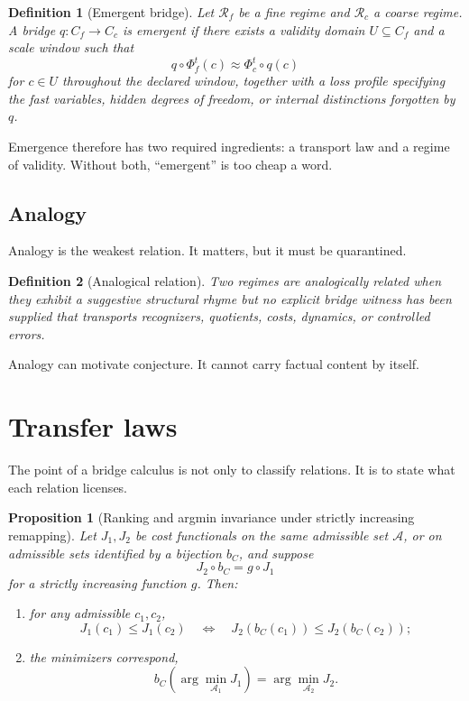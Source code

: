 \documentclass[11pt]{article}
\newtheorem{definition}{Definition}
\newtheorem{proposition}{Proposition}
\begin{document}
\begin{definition}[Emergent bridge]
Let $\mathcal{R}_f$ be a fine regime and $\mathcal{R}_c$ a coarse regime. A bridge $q:C_f\to C_c$ is emergent if there exists a validity domain $U\subseteq C_f$ and a scale window such that
\[
q\circ \Phi_f^t(c)\approx \Phi_c^t\circ q(c)
\]
for $c\in U$ throughout the declared window, together with a loss profile specifying the fast variables, hidden degrees of freedom, or internal distinctions forgotten by $q$.
\end{definition}

Emergence therefore has two required ingredients: a transport law and a regime of validity. Without both, ``emergent'' is too cheap a word.

\subsection*{Analogy}

Analogy is the weakest relation. It matters, but it must be quarantined.

\begin{definition}[Analogical relation]
Two regimes are analogically related when they exhibit a suggestive structural rhyme but no explicit bridge witness has been supplied that transports recognizers, quotients, costs, dynamics, or controlled errors.
\end{definition}

Analogy can motivate conjecture. It cannot carry factual content by itself.

\section{Transfer laws}

The point of a bridge calculus is not only to classify relations. It is to state what each relation licenses.

\begin{proposition}[Ranking and argmin invariance under strictly increasing remapping]
Let $J_1,J_2$ be cost functionals on the same admissible set $\mathcal{A}$, or on admissible sets identified by a bijection $b_C$, and suppose
\[
J_2\circ b_C = g\circ J_1
\]
for a strictly increasing function $g$. Then:
\begin{enumerate}
    \item for any admissible $c_1,c_2$,
    \[
    J_1(c_1)\le J_1(c_2)
    \quad\Longleftrightarrow\quad
    J_2(b_C(c_1))\le J_2(b_C(c_2));
    \]
    \item the minimizers correspond,
    \[
    b_C\!\left(\arg\min_{\mathcal{A}_1} J_1\right)=\arg\min_{\mathcal{A}_2} J_2.
    \]
\end{enumerate}
\end{proposition}
\end{document}
